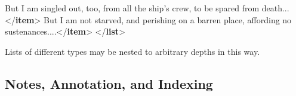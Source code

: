 \begin{shaded}
\hspace*{1em}\hspace*{1em}But I am singled out, too, from all the ship's\mbox{}\newline 
\hspace*{1em}\hspace*{1em}\hspace*{1em}\hspace*{1em}\hspace*{1em}\hspace*{1em} crew, to be spared from death...{</\textbf{item}>}\mbox{}\newline 
\hspace*{1em}\hspace*{1em}But I am not starved, and perishing on a barren place,\mbox{}\newline 
\hspace*{1em}\hspace*{1em}\hspace*{1em}\hspace*{1em}\hspace*{1em}\hspace*{1em} affording no sustenances....{</\textbf{item}>}\mbox{}\newline 
\hspace*{1em}\mbox{}\newline 
{}\mbox{}\newline 
{</\textbf{list}>}\end{shaded}\egroup\par \par
Lists of different types may be nested to arbitrary depths in this way. 
\subsection[{Notes, Annotation, and Indexing}]{Notes, Annotation, and Indexing}\label{CONO}
